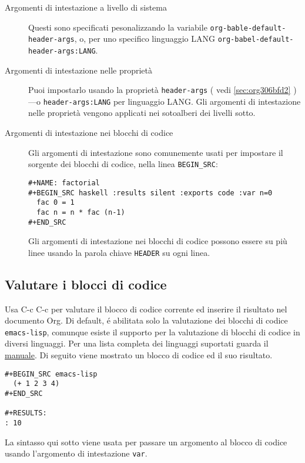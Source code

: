 \documentclass[11pt]{article}
\begin{document}
\begin{description}
\item[{Argomenti di intestazione a livello di sistema}] Questi sono specificati pesonalizzando la variabile
\texttt{org-bable-default-header-args}, o, per uno specifico linguaggio
LANG \texttt{org-babel-default-header-args:LANG}.

\item[{Argomenti di intestazione nelle proprietà}] Puoi impostarlo usando la proprietà \texttt{header-args} ( vedi \ref{sec:org306bfd2}
)---o \texttt{header-args:LANG} per linguaggio LANG. Gli
argomenti di intestazione nelle proprietà vengono applicati nei
sotoalberi dei livelli sotto.

\item[{Argomenti di intestazione nei blocchi di codice}] Gli argomenti di intestazione sono comunemente usati per impostare
il sorgente dei blocchi di codice, nella linea \texttt{BEGIN\_SRC}:

\begin{verbatim}
#+NAME: factorial
#+BEGIN_SRC haskell :results silent :exports code :var n=0
  fac 0 = 1
  fac n = n * fac (n-1)
#+END_SRC
\end{verbatim}

Gli argomenti di intestazione nei blocchi di codice possono essere
su più linee usando la parola chiave \texttt{HEADER} su ogni linea.
\end{description}

\subsection*{Valutare i blocci di codice}
\label{sec:orgee6c181}
Usa C-c C-c per valutare il blocco di codice corrente ed
inserire il risultato nel documento Org. Di default, é abilitata solo
la valutazione dei blocchi di codice \texttt{emacs-lisp}, comunque esiste il
supporto per la valutazione di blocchi di codice in diversi
linguaggi. Per una lista completa dei linguaggi suportati guarda il
\href{manual}{manuale}. Di seguito viene mostrato un blocco di codice ed il suo
risultato.

\begin{verbatim}
#+BEGIN_SRC emacs-lisp
  (+ 1 2 3 4)
#+END_SRC

#+RESULTS:
: 10
\end{verbatim}

La sintasso qui sotto viene usata per passare un argomento al blocco
di codice usando l'argomento di intestazione \texttt{var}.
\end{document}
